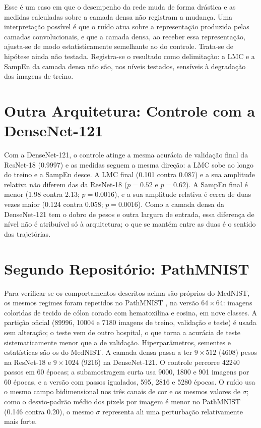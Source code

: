 Esse é um caso em que o desempenho da rede muda de forma drástica e as medidas
calculadas sobre a camada densa não registram a mudança. Uma interpretação
possível é que o ruído atua sobre a representação produzida pelas camadas
convolucionais, e que a camada densa, ao receber essa representação, ajusta-se
de modo estatisticamente semelhante ao do controle. Trata-se de hipótese ainda
não testada. Registra-se o resultado como delimitação: a LMC e a SampEn da
camada densa não são, nos níveis testados, sensíveis à degradação das imagens
de treino.

\section{Outra Arquitetura: Controle com a DenseNet-121}
\label{sec:R-densenet}

Com a DenseNet-121, o controle atinge a mesma acurácia de validação final da
ResNet-18 (\num{0,9997}) e as medidas seguem a mesma direção: a LMC sobe ao
longo do treino e a SampEn desce. A LMC final (\num{0,101} contra \num{0,087})
e a sua amplitude relativa não diferem das da ResNet-18 ($p = \num{0,52}$ e
$p = \num{0,62}$). A SampEn final é menor (\num{1,98} contra \num{2,13};
$p = \num{0,0016}$), e a sua amplitude relativa é cerca de duas vezes maior
(\num{0,124} contra \num{0,058}; $p = \num{0,0016}$). Como a camada densa da
DenseNet-121 tem o dobro de pesos e outra largura de entrada, essa diferença
de nível não é atribuível só à arquitetura; o que se mantém entre as duas é o
sentido das trajetórias.

\section{Segundo Repositório: PathMNIST}
\label{sec:R-pathmnist}

Para verificar se os comportamentos descritos acima são próprios do MedNIST,
os mesmos regimes foram repetidos no PathMNIST \cite{medmnist2023}, na
versão $64 \times 64$: imagens coloridas de tecido de cólon corado com
hematoxilina e eosina, em nove classes. A partição oficial (\num{89996},
\num{10004} e \num{7180} imagens de treino, validação e teste) é usada sem
alteração; o teste vem de outro hospital, o que torna a acurácia de teste
sistematicamente menor que a de validação. Hiperparâmetros, sementes e
estatísticas são os do MedNIST. A camada densa passa a ter $9 \times 512$
(\num{4608}) pesos na ResNet-18 e $9 \times \num{1024}$ (\num{9216}) na
DenseNet-121. O controle percorre \num{42240} passos em \num{60} épocas; a
subamostragem curta usa \num{9000}, \num{1800} e \num{901} imagens por
\num{60} épocas, e a versão com passos igualados, \num{595}, \num{2816} e
\num{5280} épocas. O ruído usa o mesmo campo bidimensional nos três canais de
cor e os mesmos valores de $\sigma$; como o desvio-padrão médio dos pixels por
imagem é menor no PathMNIST (\num{0,146} contra \num{0,20}), o mesmo $\sigma$
representa ali uma perturbação relativamente mais forte.


